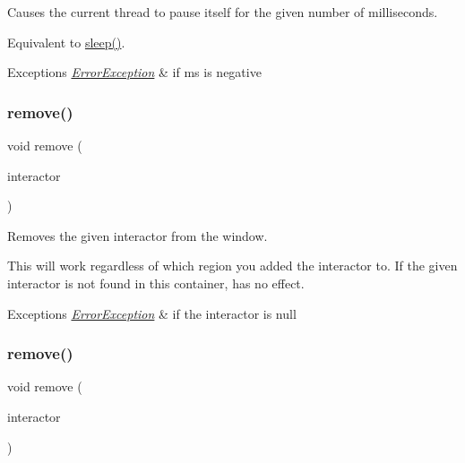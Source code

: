 Causes the current thread to pause itself for the given number of milliseconds. 

Equivalent to \mbox{\hyperlink{classGWindow_aa3381590c1ef33c08000c2fbb2bf0dd0}{sleep()}}. 
\begin{DoxyExceptions}{Exceptions}
{\em \mbox{\hyperlink{classErrorException}{Error\+Exception}}} & if ms is negative \\
\hline
\end{DoxyExceptions}
\mbox{\label{classGWindow_a1c12b1fde5c2ef10d79d4ee51e670efa}} 
\subsubsection{\texorpdfstring{remove()}{remove()}\hspace{0.1cm}{\footnotesize\ttfamily [1/4]}}
{\footnotesize\ttfamily void remove (\begin{DoxyParamCaption}\item[{\mbox{\hyperlink{classGInteractor}{G\+Interactor}} $\ast$}]{interactor }\end{DoxyParamCaption})\hspace{0.3cm}{\ttfamily [virtual]}}



Removes the given interactor from the window. 

This will work regardless of which region you added the interactor to. If the given interactor is not found in this container, has no effect. 
\begin{DoxyExceptions}{Exceptions}
{\em \mbox{\hyperlink{classErrorException}{Error\+Exception}}} & if the interactor is null \\
\hline
\end{DoxyExceptions}
\mbox{\label{classGWindow_ade2376c458ac401a0bd2dbe44271509e}} 
\subsubsection{\texorpdfstring{remove()}{remove()}\hspace{0.1cm}{\footnotesize\ttfamily [2/4]}}
{\footnotesize\ttfamily void remove (\begin{DoxyParamCaption}\item[{\mbox{\hyperlink{classGInteractor}{G\+Interactor}} \&}]{interactor }\end{DoxyParamCaption})\hspace{0.3cm}{\ttfamily [virtual]}}



